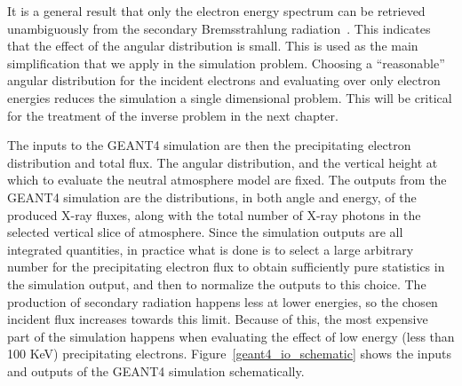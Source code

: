 It is a general result that only the electron energy spectrum can be retrieved unambiguously from the secondary Bremsstrahlung radiation~\citep{Brown2006}. This indicates that the effect of the angular distribution is small. This is used as the main simplification that we apply in the simulation problem. Choosing a ``reasonable'' angular distribution for the incident electrons and evaluating over only electron energies reduces the simulation a single dimensional problem. This will be critical for the treatment of the inverse problem in the next chapter. 

The inputs to the GEANT4 simulation are then the precipitating electron distribution and total flux. The angular distribution, and the vertical height at which to evaluate the neutral atmosphere model are fixed. The outputs from the GEANT4 simulation are the distributions, in both angle and energy, of the produced X-ray fluxes, along with the total number of X-ray photons in the selected vertical slice of atmosphere. Since the simulation outputs are all integrated quantities, in practice what is done is to select a large arbitrary number for the precipitating electron flux to obtain sufficiently pure statistics in the simulation output, and then to normalize the outputs to this choice. The production of secondary radiation happens less at lower energies, so the chosen incident flux increases towards this limit. Because of this, the most expensive part of the simulation happens when evaluating the effect of low energy (less than 100 KeV) precipitating electrons. Figure~\ref{geant4_io_schematic} shows the inputs and outputs of the GEANT4 simulation schematically. 

